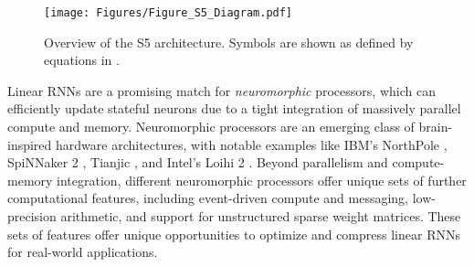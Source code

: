 
\begin{figure*}[ht]
    \centering
    \texttt{[image: Figures/Figure\_S5\_Diagram.pdf]}
    \caption{Overview of the S5 architecture. Symbols are shown as defined by equations in .}%
    \label{figure_3}
\end{figure*}

Linear RNNs are a promising match for \textit{neuromorphic} processors, which can efficiently update stateful neurons due to a tight integration of massively parallel compute and memory. Neuromorphic processors are an emerging class of brain-inspired hardware architectures, with notable examples like IBM’s NorthPole \cite{Modha2023}, SpiNNaker 2 \cite{DBLP:journals/corr/abs-1911-02385}, Tianjic \cite{Pei2019}, and Intel’s Loihi 2 \cite{DBLP:conf/sips/OrchardFRSSSD21}. Beyond parallelism and compute-memory integration, different neuromorphic processors offer unique sets of further computational features, including event-driven compute and messaging, low-precision arithmetic, and support for unstructured sparse weight matrices. These sets of features offer unique opportunities to optimize and compress linear RNNs for real-world applications.

